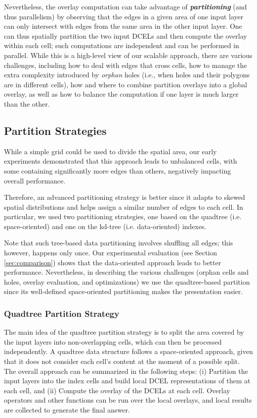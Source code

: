 Nevertheless, the overlay computation can take advantage of \textit{\textbf{partitioning}} (and thus parallelism) by observing that the edges in a given area of 
one input layer can only intersect with edges from the same area in the other input layer. One can thus spatially partition the two input DCELs 
and then compute the overlay within each cell; such computations are independent and can be performed in parallel. While this is a high-level view of our 
scalable approach, there are various challenges, including how to deal with edges that cross cells, how to manage the extra complexity introduced by 
\textit{orphan} holes (i.e., when holes and their polygons are in different cells), how and where to combine partition overlays into a global overlay, as well 
as how to balance the computation if one layer is much larger than the other. 

\subsection{Partition Strategies} \label{sec:pstrategies}
While a simple grid could be used to divide the spatial area, our early experiments demonstrated that this approach leads to unbalanced cells, with some 
containing significantly more edges than others, negatively impacting overall performance.

Therefore, an advanced partitioning strategy is better since it adapts to skewed spatial distributions and helps assign a similar number of edges to each cell. 
In particular, we used two partitioning strategies, one based on the quadtree (i.e. space-oriented) and one on the kd-tree (i.e. data-oriented) indexes.

Note that such tree-based data partitioning involves shuffling all edges; this however, happens only once.
Our experimental evaluation (see Section \ref{sec:comparison}) shows that the data-oriented approach leads to better performance. Nevertheless, in describing 
the various challenges (orphan cells and holes, overlay evaluation, and optimizations) we use the quadtree-based partition since its well-defined space-oriented 
partitioning makes the presentation easier.

\subsubsection{Quadtree Partition Strategy}\label{sec:strategy}
The main idea of the quadtree partition strategy is to split the area covered by the input layers into non-overlapping cells, which can then be processed 
independently. 
A quadtree data structure follows a space-oriented approach, given that it does not consider each cell's content at the moment of a possible split. 
The overall approach can be summarized in the following steps: (i) Partition the input layers into the index cells and build local DCEL representations of them 
at each cell, and (ii) Compute the overlay of the DCELs at each cell. Overlay operators and other functions can be run over the local overlays, and local 
results are collected to generate the final answer.  

